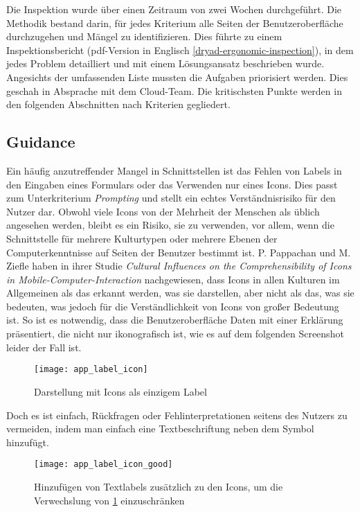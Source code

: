 
Die Inspektion wurde über einen Zeitraum von zwei Wochen durchgeführt. Die Methodik bestand darin, für jedes Kriterium alle Seiten der Benutzeroberfläche durchzugehen und Mängel zu identifizieren.
Dies führte zu einem Inspektionsbericht (pdf-Version in Englisch \ref{dryad-ergonomic-inspection}), in dem jedes Problem detailliert und mit einem Lösungsansatz beschrieben wurde. Angesichts der umfassenden Liste mussten die Aufgaben priorisiert werden.
Dies geschah in Absprache mit dem Cloud-Team.
Die kritischsten Punkte werden in den folgenden Abschnitten nach Kriterien gegliedert.

\subsection{Guidance}

Ein häufig anzutreffender Mangel in Schnittstellen ist das Fehlen von Labels in den Eingaben eines Formulars oder das Verwenden nur eines Icons.
Dies passt zum Unterkriterium \textit{Prompting} und stellt ein echtes Verständnisrisiko für den Nutzer dar.
Obwohl viele Icons von der Mehrheit der Menschen als üblich angesehen werden, bleibt es ein Risiko, sie zu verwenden, vor allem, wenn die Schnittstelle für mehrere Kulturtypen oder mehrere Ebenen der Computerkenntnisse auf Seiten der Benutzer bestimmt ist.
P. Pappachan und M. Ziefle haben in ihrer Studie \textit{Cultural Influences on the Comprehensibility of Icons in Mobile-Computer-Interaction}\cite{iconsCultureInfluence} nachgewiesen, dass Icons in allen Kulturen im Allgemeinen als das erkannt werden, was sie darstellen, aber nicht als das, was sie bedeuten, was jedoch für die Verständlichkeit von Icons von großer Bedeutung ist.
So ist es notwendig, dass die Benutzeroberfläche Daten mit einer Erklärung präsentiert, die nicht nur ikonografisch ist, wie es auf dem folgenden Screenshot leider der Fall ist.

\begin{figure}[H]
  \centering
  \texttt{[image: app\_label\_icon]}
  \caption{Darstellung mit Icons als einzigem Label}
  \label{fig:app_label_icon}
\end{figure}

Doch es ist einfach, Rückfragen oder Fehlinterpretationen seitens des Nutzers zu vermeiden, indem man einfach eine Textbeschriftung neben dem Symbol hinzufügt.

\begin{figure}[H]
  \centering
  \texttt{[image: app\_label\_icon\_good]}
  \caption{Hinzufügen von Textlabels zusätzlich zu den Icons, um die Verwechslung von \ref{fig:app_label_icon} einzuschränken}
\end{figure}


